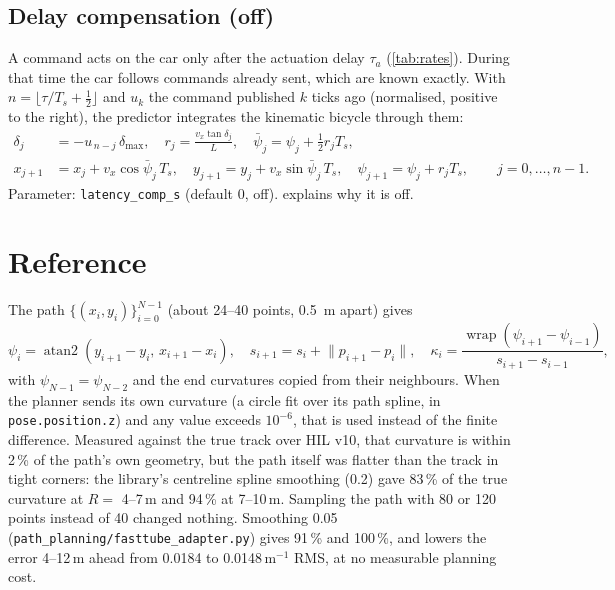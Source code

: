 \documentclass[11pt,a4paper]{article}
\newcommand{\wrap}{\operatorname{wrap}}
\begin{document}
\subsection{Delay compensation (off)}\label{sec:delaycomp}
A command acts on the car only after the actuation delay $\tau_a$
(\cref{tab:rates}). During that time the car follows commands already sent, which are
known exactly. With $n = \lfloor \tau / T_s + \tfrac12 \rfloor$ and $u_k$ the
command published $k$ ticks ago (normalised, positive to the right), the predictor
integrates the kinematic bicycle through them:
\begin{equation}
\begin{aligned}
\delta_j &= -u_{\,n-j}\,\delta_{\max}, \quad r_j = \frac{v_x \tan\delta_j}{L}, \quad
\bar\psi_j = \psi_j + \tfrac12 r_j T_s, \\
x_{j+1} &= x_j + v_x \cos\bar\psi_j\, T_s, \quad
y_{j+1} = y_j + v_x \sin\bar\psi_j\, T_s, \quad
\psi_{j+1} = \psi_j + r_j T_s, \qquad j = 0,\dots,n-1 .
\end{aligned}
\label{eq:predict}
\end{equation}
Parameter: \texttt{latency\_comp\_s} (default \num{0}, off). 
explains why it is off.

\section{Reference}
The path $\{(x_i, y_i)\}_{i=0}^{N-1}$ (about 24--40 points, \SI{0.5}{\metre} apart) gives
\begin{equation}
\psi_i = \operatorname{atan2}(y_{i+1}-y_i,\, x_{i+1}-x_i), \quad
s_{i+1} = s_i + \lVert p_{i+1} - p_i \rVert, \quad
\kappa_i = \frac{\wrap(\psi_{i+1} - \psi_{i-1})}{s_{i+1} - s_{i-1}},
\label{eq:ref}
\end{equation}
with $\psi_{N-1} = \psi_{N-2}$ and the end curvatures copied from their neighbours. When
the planner sends its own curvature (a circle fit over its path spline, in \texttt{pose.position.z})
and any value exceeds $10^{-6}$, that is used instead of the finite difference.
Measured against the true track over HIL v10, that curvature is within 2\,\% of the
path's own geometry, but the path itself was flatter than the track in tight corners: the
library's centreline spline smoothing (0.2) gave 83\,\% of the true curvature at
$R = $ 4--7\,m and 94\,\% at 7--10\,m. Sampling the path with 80 or 120 points instead of
40 changed nothing. Smoothing 0.05 (\texttt{path\_planning/fasttube\_adapter.py}) gives
91\,\% and 100\,\%, and lowers the error 4--12\,m ahead from 0.0184 to 0.0148\,m$^{-1}$
RMS, at no measurable planning cost.
\end{document}

